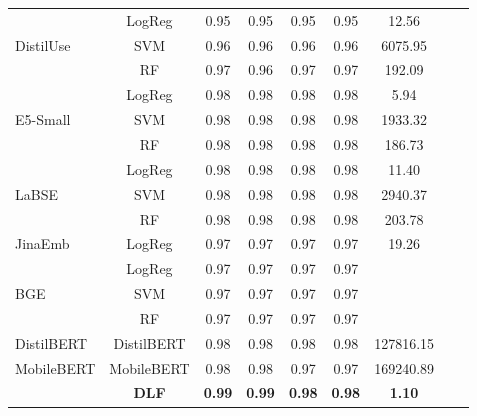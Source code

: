 \documentclass[11pt]{article}
\begin{document}
\begin{table}[h]
{\begin{tabular}{@{}lcccccccc@{}}
 \midrule
\multirow{3}{*}{DistilUse} & LogReg & 0.95 & 0.95 & 0.95 & 0.95 & 12.56\\
 & SVM & 0.96 & 0.96 & 0.96 & 0.96 & 6075.95\\
 & RF & 0.97 & 0.96 & 0.97 & 0.97 & 192.09\\
 \midrule
\multirow{3}{*}{E5-Small} & LogReg & 0.98 & 0.98 & 0.98 & 0.98 & 5.94\\
 & SVM & 0.98 & 0.98 & 0.98 & 0.98 & 1933.32\\
 & RF & 0.98 & 0.98 & 0.98 & 0.98 & 186.73\\
 \midrule
\multirow{3}{*}{LaBSE} & LogReg & 0.98 & 0.98 & 0.98 & 0.98 & 11.40\\
 & SVM & 0.98 & 0.98 & 0.98 & 0.98 & 2940.37\\
 & RF & 0.98 & 0.98 & 0.98 & 0.98 & 203.78\\
 \midrule
\multirow{1}{*}{JinaEmb} & LogReg & 0.97 & 0.97 & 0.97 & 0.97 & 19.26\\
\midrule
\multirow{3}{*}{BGE} & LogReg & 0.97 & 0.97 & 0.97 & 0.97 \\
 & SVM & 0.97 & 0.97 & 0.97 & 0.97 \\
 & RF & 0.97 & 0.97 & 0.97 & 0.97 \\



 \midrule
DistilBERT & DistilBERT & 0.98 & 0.98 & 0.98 & 0.98 & 127816.15\\

 \midrule
MobileBERT & MobileBERT & 0.98 & 0.98 & 0.97 & 0.97 & 169240.89\\

 \midrule
\textbf{} & \textbf{DLF} & \textbf{0.99} & \textbf{0.99} & \textbf{0.98} & \textbf{0.98} & \textbf{1.10}\\

\bottomrule
\end{tabular}%
}
\end{table}
\end{document}
